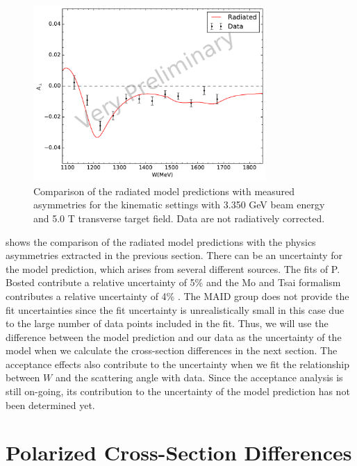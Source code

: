 \begin{figure}[tb!]
  \centering
  \includegraphics[width=0.79\textwidth]{figs/asymmetry-data-model-33505090.pdf}
  \caption[Asymmetries with $E=3.350$ GeV and $B=5.0$ T.]{Comparison of the radiated model predictions with measured asymmetries for the kinematic settings with 3.350 GeV beam energy and 5.0 T transverse target field. Data are not radiatively corrected. \label{C8S2F7}}
\end{figure}

 shows the comparison of the radiated model predictions with the physics asymmetries extracted in the previous section. There can be an uncertainty for the model prediction, which arises from several different sources. The fits of P. Bosted contribute a relative uncertainty of 5\% \cite{Bosted2008} and the Mo and Tsai formalism contributes a relative uncertainty of 4\% \cite{Mo1969}. The MAID group does not provide the fit uncertainties since the fit uncertainty is unrealistically small in this case due to the large number of data points included in the fit. Thus, we will use the difference between the model prediction and our data as the uncertainty of the model when we calculate the cross-section differences in the next section. The acceptance effects also contribute to the uncertainty when we fit the relationship between $W$ and the scattering angle with data. Since the acceptance analysis is still on-going, its contribution to the uncertainty of the model prediction has not been determined yet.

\section{Polarized Cross-Section Differences}
\label{C8S3}

